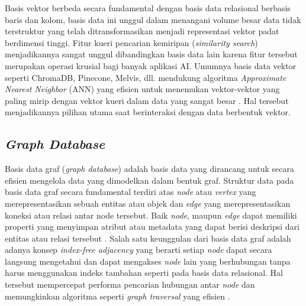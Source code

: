 Basis vektor berbeda secara fundamental dengan basis data relasional berbasis baris dan kolom, basis data ini unggul dalam menangani volume besar data tidak terstruktur yang telah ditransformasikan menjadi representasi vektor padat berdimensi tinggi.
Fitur kueri pencarian kemiripan (\textit{similarity search}) menjadikannya sangat unggul dibandingkan basis data lain karena fitur tersebut merupakan operasi krusial bagi banyak aplikasi AI.
Umumnya basis data vektor seperti ChromaDB, Pinecone, Melvis, dll. mendukung algoritma \textit{Approximate Nearest Neighbor} (ANN) yang efisien untuk menemukan vektor-vektor yang paling mirip dengan vektor kueri dalam data yang sangat besar \cite{Han2023VectorDB_ANN_SimilaritySearch}.
Hal tersebut menjadikannya pilihan utama saat berinteraksi dengan data berbentuk vektor.

\subsection{\textit{Graph Database}}
Basis data graf (\textit{graph database}) adalah basis data yang dirancang untuk secara efisien mengelola data yang dimodelkan dalam bentuk graf.
Struktur data pada basis data graf secara fundamental terdiri atas \textit{node} atau \textit{vertex} yang merepresentasikan sebuah entitas atau objek dan \textit{edge} yang merepresentasikan koneksi atau relasi antar node tersebut.
Baik \textit{node}, maupun \textit{edge} dapat memiliki properti yang menyimpan atribut atau metadata yang dapat berisi deskripsi dari entitas atau relasi tersebut \cite{Paul2019GraphDB}.
Salah satu keunggulan dari basis data graf adalah adanya konsep \textit{index-free adjacency} yang berarti setiap \textit{node} dapat secara langsung mengetahui dan dapat mengakses \textit{node} lain yang berhubungan tanpa harus menggunakan indeks tambahan seperti pada basis data relasional.
Hal tersebut mempercepat performa pencarian hubungan antar \textit{node} dan memungkinkan algoritma seperti \textit{graph traversal} yang efisien \cite{Paul2019GraphDB}.

